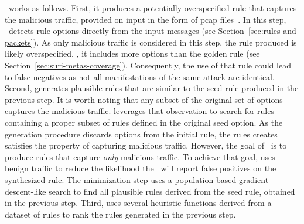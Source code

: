 \documentclass[sigconf,review, anonymous]{acmart}
\begin{document}
\tname\ works as follows. First, it produces a potentially
overspecified rule that captures the malicious traffic, provided on
input in the form of pcap files~\cite{pcap}. In this step,
\tname\ detects rule options directly from the input messages (see
Section~\ref{sec:rules-and-packets}). As only malicious traffic is
considered in this step, the rule produced is likely overspecified,
\ie{}, it includes more options than the golden rule (see
Section~\ref{sec:suri-metas-coverage}). Consequently, the use of that
rule could lead to false negatives as not all manifestations of the
same attack are identical. Second, \tname{} generates plausible rules
that are similar to the seed rule produced in the previous step. It is
worth noting that any subset of the original set of options captures
the malicious traffic. \tname{} leverages that observation to search
for rules containing a proper subset of rules defined in the original
seed option. As the generation procedure discards options from the
initial rule, the rules \tname{} creates satisfies the property of
capturing malicious traffic. However, the goal of \tname\ is to
produce rules that capture \emph{only} malicious traffic. To achieve
that goal, \tname{} uses benign traffic to reduce the likelihood the
\nids\ will report false positives on the synthesized rule. The
minimization step uses a population-based gradient descent-like search
to find all plausible rules derived from the seed rule, obtained in
the previous step. Third, \tname{} uses several heuristic functions
derived from a dataset of rules to rank the rules generated in the
previous step.



\end{document}
